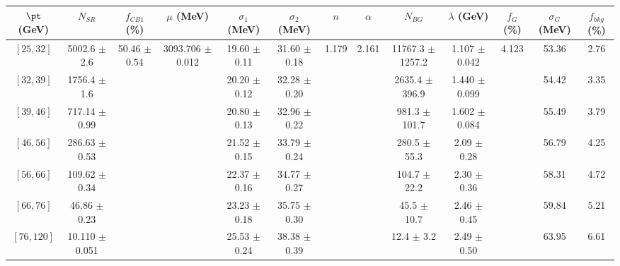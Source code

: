 \begin{tabular}{c||c|c|c|c|c|c|c|c|c|c|c||c}
$\pt$ (GeV) & $N_{SR}$ & $f_{CB1}$ (\%) & $\mu$ (MeV) & $\sigma_1$ (MeV) & $\sigma_2$ (MeV) & $n$ & $\alpha$ & $N_{BG}$ & $\lambda$ (GeV) & $f_G$ (\%) & $\sigma_G$ (MeV) & $f_{bkg}$ (\%) \\
\hline
$[25, 32]$ & 5002.6 $\pm$ 2.6 & \multirow{7}{*}{50.46 $\pm$ 0.54} & \multirow{7}{*}{3093.706 $\pm$ 0.012} & 19.60 $\pm$ 0.11 & 31.60 $\pm$ 0.18 & \multirow{7}{*}{1.179} & \multirow{7}{*}{2.161} & 11767.3 $\pm$ 1257.2 & 1.107 $\pm$ 0.042 & \multirow{7}{*}{4.123} & 53.36 & 2.76\\
$[32, 39]$ & 1756.4 $\pm$ 1.6 &  &  & 20.20 $\pm$ 0.12 & 32.28 $\pm$ 0.20 &  &  & 2635.4 $\pm$ 396.9 & 1.440 $\pm$ 0.099 &  & 54.42 & 3.35\\
$[39, 46]$ & 717.14 $\pm$ 0.99 &  &  & 20.80 $\pm$ 0.13 & 32.96 $\pm$ 0.22 &  &  & 981.3 $\pm$ 101.7 & 1.602 $\pm$ 0.084 &  & 55.49 & 3.79\\
$[46, 56]$ & 286.63 $\pm$ 0.53 &  &  & 21.52 $\pm$ 0.15 & 33.79 $\pm$ 0.24 &  &  & 280.5 $\pm$ 55.3 & 2.09 $\pm$ 0.28 &  & 56.79 & 4.25\\
$[56, 66]$ & 109.62 $\pm$ 0.34 &  &  & 22.37 $\pm$ 0.16 & 34.77 $\pm$ 0.27 &  &  & 104.7 $\pm$ 22.2 & 2.30 $\pm$ 0.36 &  & 58.31 & 4.72\\
$[66, 76]$ & 46.86 $\pm$ 0.23 &  &  & 23.23 $\pm$ 0.18 & 35.75 $\pm$ 0.30 &  &  & 45.5 $\pm$ 10.7 & 2.46 $\pm$ 0.45 &  & 59.84 & 5.21\\
$[76, 120]$ & 10.110 $\pm$ 0.051 &  &  & 25.53 $\pm$ 0.24 & 38.38 $\pm$ 0.39 &  &  & 12.4 $\pm$ 3.2 & 2.49 $\pm$ 0.50 &  & 63.95 & 6.61\\
\end{tabular}
